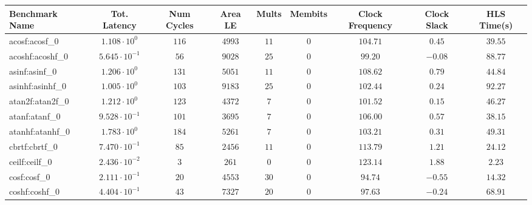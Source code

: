 \begin{tabular}{|l|c|c|c|c|c|c|c|c|}
\hline
Benchmark Name               & Tot. Latency            & Num Cycles & Area LE    & Mults   & Membits & Clock Frequency & Clock Slack & HLS Time(s) \\
\hline
acosf:acosf\_0               & $ 1.108 \cdot 10^{0}  $ & $ 116    $ & $ 4993   $ & $ 11  $ & $ 0   $ & $ 104.71      $ & $ 0.45    $ & $ 39.55   $ \\
acoshf:acoshf\_0             & $ 5.645 \cdot 10^{-1} $ & $ 56     $ & $ 9028   $ & $ 25  $ & $ 0   $ & $ 99.20       $ & $ -0.08   $ & $ 88.77   $ \\
asinf:asinf\_0               & $ 1.206 \cdot 10^{0}  $ & $ 131    $ & $ 5051   $ & $ 11  $ & $ 0   $ & $ 108.62      $ & $ 0.79    $ & $ 44.84   $ \\
asinhf:asinhf\_0             & $ 1.005 \cdot 10^{0}  $ & $ 103    $ & $ 9183   $ & $ 25  $ & $ 0   $ & $ 102.44      $ & $ 0.24    $ & $ 92.27   $ \\
atan2f:atan2f\_0             & $ 1.212 \cdot 10^{0}  $ & $ 123    $ & $ 4372   $ & $ 7   $ & $ 0   $ & $ 101.52      $ & $ 0.15    $ & $ 46.27   $ \\
atanf:atanf\_0               & $ 9.528 \cdot 10^{-1} $ & $ 101    $ & $ 3695   $ & $ 7   $ & $ 0   $ & $ 106.00      $ & $ 0.57    $ & $ 38.15   $ \\
atanhf:atanhf\_0             & $ 1.783 \cdot 10^{0}  $ & $ 184    $ & $ 5261   $ & $ 7   $ & $ 0   $ & $ 103.21      $ & $ 0.31    $ & $ 49.31   $ \\
cbrtf:cbrtf\_0               & $ 7.470 \cdot 10^{-1} $ & $ 85     $ & $ 2456   $ & $ 11  $ & $ 0   $ & $ 113.79      $ & $ 1.21    $ & $ 24.12   $ \\
ceilf:ceilf\_0               & $ 2.436 \cdot 10^{-2} $ & $ 3      $ & $ 261    $ & $ 0   $ & $ 0   $ & $ 123.14      $ & $ 1.88    $ & $ 2.23    $ \\
cosf:cosf\_0                 & $ 2.111 \cdot 10^{-1} $ & $ 20     $ & $ 4553   $ & $ 30  $ & $ 0   $ & $ 94.74       $ & $ -0.55   $ & $ 14.32   $ \\
coshf:coshf\_0               & $ 4.404 \cdot 10^{-1} $ & $ 43     $ & $ 7327   $ & $ 20  $ & $ 0   $ & $ 97.63       $ & $ -0.24   $ & $ 68.91   $ \\

\end{tabular}

